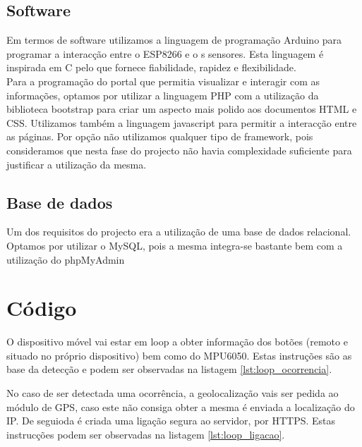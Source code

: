\FloatBarrier\subsection{Software}

Em termos de software utilizamos a linguagem de programação Arduino\cite{language} para programar a interacção entre o ESP8266 e o s sensores. Esta linguagem é inspirada em C pelo que fornece fiabilidade, rapidez e flexibilidade.\\
Para a programação do portal que permitia visualizar e interagir com as informações, optamos por utilizar a linguagem PHP\cite{PHP} com a utilização da biblioteca bootstrap\cite{bootstrap} para criar um aspecto mais polido aos documentos HTML e CSS. Utilizamos também a linguagem javascript \cite{javascript} para permitir a interacção entre as páginas. Por opção não utilizamos qualquer tipo de framework, pois consideramos que nesta fase do projecto não havia complexidade suficiente para justificar a utilização da mesma.

\FloatBarrier\subsection{Base de dados}

Um dos requisitos do projecto era a utilização de uma base de dados relacional. Optamos por utilizar o MySQL, pois a mesma integra-se bastante bem com a utilização do phpMyAdmin \cite{phpmyadmin}

\section{Código}

O dispositivo móvel vai estar em loop a obter informação dos botões (remoto e situado no próprio dispositivo) bem como do MPU6050. Estas instruções são as base da detecção e podem ser observadas na listagem \ref{lst:loop_ocorrencia}.



No caso de ser detectada uma ocorrência, a geolocalização vais ser pedida ao módulo de GPS, caso este não consiga obter a mesma é enviada a localização do IP. De seguioda é criada uma ligação segura ao servidor, por HTTPS. Estas instrucções podem ser observadas na listagem \ref{lst:loop_ligacao}.




